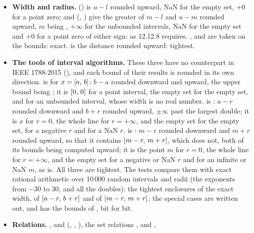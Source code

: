 \begin{itemize}
  tightest.
\item[$\bullet$] \textbf{Width and radius.}  () is
  $u-l$ rounded upward, NaN for the empty set, $+0$ for a point zero;  and
   (, ) give the greater of
  $m-l$ and $u-m$ rounded upward, $m$ being , $+\infty$
  for the unbounded intervals, NaN for the empty set and $+0$ for a point zero
  of either sign: as 12.12.8 requires. ,  and  are taken on the
  bounds: exact.  is the distance rounded upward:
  tightest.
\item[$\bullet$] \textbf{The tools of interval algorithms.} These three
  have no counterpart in IEEE 1788-2015 (), and each bound
  of their results is rounded in its own direction.\newinvfive{}
   is  for
  $x=[a,\,b]$: $b-a$ rounded downward and upward, the upper bound being
  ; it is $[0,\,0]$ for a point interval, the empty set for
  the empty set, and  for an unbounded interval,
  whose width is no real number.  is
  : $a-r$ rounded downward and $b+r$ rounded
  upward, $\pm\infty$ past the largest double; it is $x$ for $r=0$, the
  whole line for $r=+\infty$, and the empty set for the empty set, for a
  negative $r$ and for a NaN $r$.  is
  : $m-r$ rounded downward and $m+r$
  rounded upward, so that it contains $[m-r,\,m+r]$, which
   does not, both of its bounds being computed
  upward; it is the point $m$ for $r=0$, the whole line for $r=+\infty$, and
  the empty set for a negative or NaN $r$ and for an infinite or NaN $m$, as
   is. All three are tightest. The tests compare them with
  exact rational arithmetic over 10\,000 random intervals and radii (the
  exponents from $-30$ to $30$, and all the doubles): the tightest
  enclosures of the exact width, of $[a-r,\,b+r]$ and of
  $[m-r,\,m+r]$; the special cases are written out, and
   has the bounds of
  , bit for bit.
\item[$\bullet$] \textbf{Relations.} ,
   and  (,
  , ), the set relations ,
   and , 

\end{itemize}
